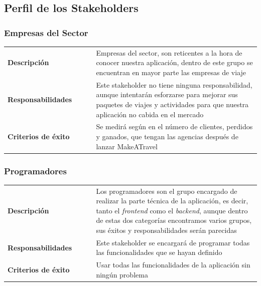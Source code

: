 \documentclass[11pt]{article}
\begin{document}
\subsection{Perfil de los Stakeholders}

\subsubsection{Empresas del Sector}
\begin{table}[H]
  \centering
  \begin{tabular}{p{0.35\linewidth}|p{0.65\linewidth}}
    \toprule
       \textbf{Descripción} & Empresas del sector, son reticentes a la hora de conocer nuestra aplicación, dentro de este grupo se encuentran en mayor parte las empresas de viaje\\
    \textbf{Responsabilidades} & Este stakeholder no tiene ninguna responsabilidad, aunque intentarán esforzarse para mejorar sus paquetes de viajes y actividades para que nuestra aplicación no cabida en el mercado\\
    \textbf{Criterios de éxito} & Se medirá según en el número de clientes, perdidos y ganados, que tengan las agencias después de lanzar MakeATravel\\
    \bottomrule
  \end{tabular}
\end{table}

\subsubsection{Programadores}
\begin{table}[H]
  \centering
  \begin{tabular}{p{0.35\linewidth}|p{0.65\linewidth}}
    \toprule
    \textbf{Descripción} & Los programadores son el grupo encargado de realizar la parte técnica de la aplicación, es decir, tanto el \textit{frontend} como el \textit{backend}, aunque dentro de estas dos categorías encontramos varios grupos, sus éxitos y responsabilidades serán parecidas\\ 
    \textbf{Responsabilidades} & Este stakeholder se encargará de programar todas las funcionalidades que se hayan definido\\
    \textbf{Criterios de éxito} & Usar todas las funcionalidades de la aplicación sin ningún problema\\
    \bottomrule
  \end{tabular}
\end{table}
\end{document}
